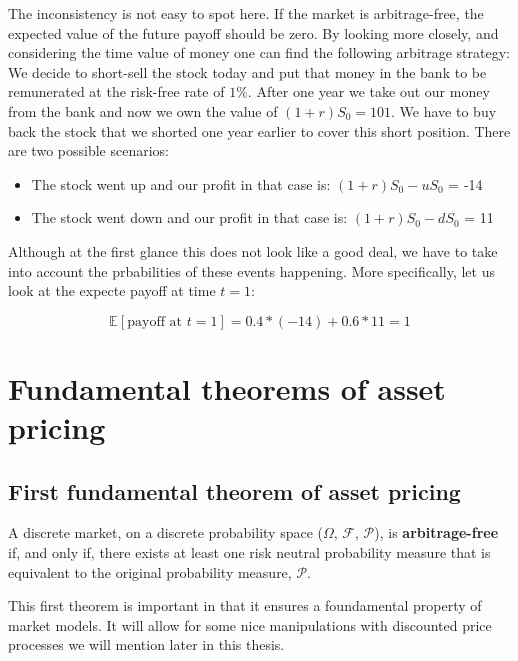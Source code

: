 \documentclass[times, utf8, diplomski]{fer}
\begin{document}
The inconsistency is not easy to spot here. If the market is arbitrage-free, the expected value of the future payoff should be zero. By looking more closely, and considering the time value of money one can find the following arbitrage strategy:
We decide to short-sell the stock today and put that money in the bank to be remunerated at the risk-free rate of $1\%$. After one year we take out our money from the bank and now we own the value of $(1+r)S_0 = 101$. We have to buy back the stock that we shorted one year earlier to cover this short position. There are two possible scenarios:
\hfill \break
\begin{itemize}
	\item The stock went up and our profit in that case is: $(1+r)S_0 - uS_0$ = -14
	\item The stock went down and our profit in that case is: $(1+r)S_0 - dS_0$ = 11
\end{itemize}
\hfill \break
Although at the first glance this does not look like a good deal, we have to take into account the prbabilities of these events happening. More specifically, let us look at the expecte payoff at time $t=1$:

$$\mathbb{E}[\text{payoff at } t=1] = 0.4 * (-14) + 0.6 * 11 = 1$$


\newpage
\section{Fundamental theorems of asset pricing}
\subsection{First fundamental theorem of asset pricing}
\begin{theorem}
A discrete market, on a discrete probability space ($\Omega$, $\mathcal{F}$, $\mathcal{P}$), is \textbf{arbitrage-free} if, and only if, there exists at least one risk neutral probability measure that is equivalent to the original probability measure, $\mathcal{P}$.
\end{theorem}

\hfill \break
This first theorem is important in that it ensures a foundamental property of market models. It will allow for some nice manipulations with discounted price processes we will mention later in this thesis.

\end{document}
